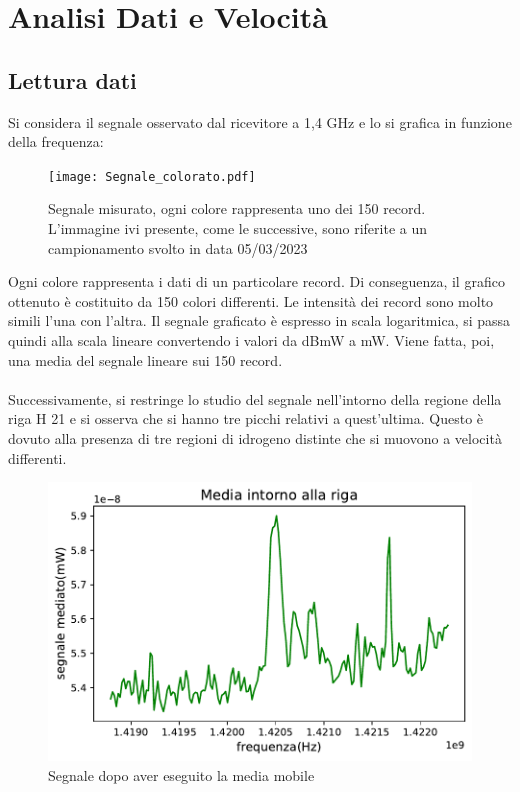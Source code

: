 \section{Analisi Dati e Velocità}
\label{Analisi Dati e Velocità}



\subsection{Lettura dati}

Si considera il segnale osservato dal ricevitore a 1,4 GHz e lo si grafica in funzione della frequenza:

\begin{figure}[H]
	\centering
	\texttt{[image: Segnale\_colorato.pdf]}
	\caption{Segnale misurato, ogni colore rappresenta uno dei 150 record. L'immagine ivi presente, come le successive, sono riferite a un campionamento svolto in data 05/03/2023}
    	\label{fig:Segnale_colorato}
\end{figure}

Ogni colore rappresenta i dati di un particolare record. Di conseguenza, il grafico ottenuto è costituito da 150 colori differenti. Le intensità dei record sono molto simili l'una con l'altra.
Il segnale graficato è espresso in scala logaritmica, si passa quindi alla scala lineare convertendo i valori da dBmW a mW. Viene fatta, poi, una media del segnale lineare sui 150 record.
\\\\
Successivamente, si restringe lo studio del segnale nell'intorno della regione della riga H 21 e si osserva che si hanno tre picchi relativi a quest'ultima. Questo è dovuto alla presenza di tre regioni di idrogeno distinte che si muovono a velocità differenti.

\begin{figure}[H]
	\centering
	\includegraphics[scale=0.8]{Media_segnale.pdf}
	\caption{Segnale dopo aver eseguito la media mobile}
    	\label{fig:Media_segnale}
\end{figure}  


